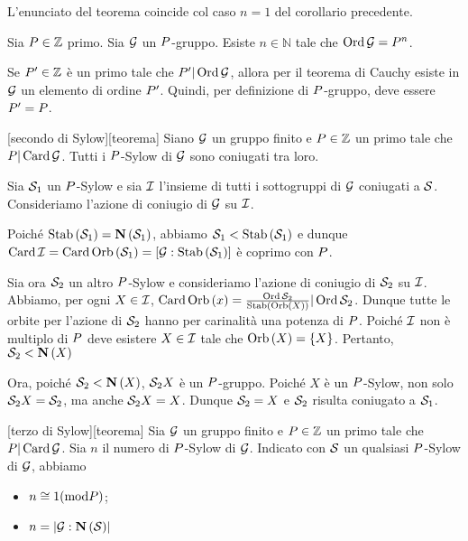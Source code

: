 \Proof
L'enunciato del teorema coincide col caso $n = 1$ del corollario precedente.
\EndProof
\begin{Corollary}
	Sia $P \in \mathbb{Z}$ primo.
	Sia $\mathcal{G}$ un $P$-gruppo.
	Esiste $n \in \mathbb{N}$ tale che
	$\operatorname{\operatorname{Ord}}{\mathcal{G}} = P^n$.
\end{Corollary}
\Proof
Se $P' \in \mathbb{Z}$ \`e un primo tale che
$P' | \operatorname{\operatorname{Ord}}{\mathcal{G}}$,
allora per il teorema di Cauchy esiste in $\mathcal{G}$ un elemento di
ordine $P'$.
Quindi, per definizione di $P$-gruppo,
deve essere $P' = P$.
\EndProof
\begin{Theorem}
[secondo di Sylow][teorema]
	Siano $\mathcal{G}$ un gruppo finito e 
	$P \in \mathbb{Z}$ un primo tale che
	$P | \operatorname{Card}{\mathcal{G}}$.
	Tutti i $P$-Sylow di $\mathcal{G}$ sono coniugati tra loro.
\end{Theorem}
\Proof
Sia $\Sylow_1$ un $P$-Sylow e
sia $\mathcal{I}$ l'insieme di tutti i sottogruppi di $\mathcal{G}$
coniugati a $\Sylow$.
Consideriamo l'azione di coniugio di $\mathcal{G}$ su $\mathcal{I}$.
\par
Poich\'e $\Stabilizer{\Sylow_1} = \Normalizer{\Sylow_1}$,
abbiamo $\Sylow_1 \IsSubgroup \Stabilizer{\Sylow_1}$ e dunque
$\Cardinality{\Set} =
\Cardinality{\Orbit{\Sylow_1}} =
\GroupIndex{\Group}{\Stabilizer{\Sylow_1}}$
\`e coprimo con $P$.
\par
Sia ora $\Sylow_2$ un altro $P$-Sylow e
consideriamo l'azione di coniugio di $\Sylow_2$ su $\mathcal{I}$.
Abbiamo, per ogni $X \in \mathcal{I}$,
$\Cardinality{\Orbit{x}} =
\frac{\GroupOrder{\Sylow_2}}{\Stabilizer{\Orbit{X}}} |
\GroupOrder{\Sylow_2}$.
Dunque tutte le orbite per l'azione di $\Sylow_2$ hanno per carinalit\`a
una potenza di $P$. Poich\'e $\mathcal{I}$ non \`e multiplo di $P$ deve
esistere $X \in \mathcal{I}$ tale che $\Orbit{X} = \lbrace X \rbrace$.
Pertanto, $\Sylow_2 \IsSubgroup \Normalizer{X}$
\par
Ora, poich\'e $\Sylow_2 \IsSubgroup \Normalizer{X}$, $\Sylow_2 X$ \`e un
$P$-gruppo. Poich\'e $X$ \`e un $P$-Sylow, non solo
$\Sylow_2 X = \Sylow_2$, ma anche $\Sylow_2 X = X$. Dunque $\Sylow_2 = X$
e $\Sylow_2$ risulta coniugato a $\Sylow_1$.
\EndProof
\begin{Theorem}
[terzo di Sylow][teorema]
	Sia $\mathcal{G}$ un gruppo finito e
	$P \in \mathbb{Z}$ un primo tale che
	$P | \operatorname{Card}{\mathcal{G}}$.
	Sia $n$ il numero di $P$-Sylow di $\mathcal{G}$.
	Indicato con $\Sylow$ un qualsiasi $P$-Sylow di $\mathcal{G}$,
	abbiamo
	\begin{itemize}
		\item $n \cong 1 (\text{mod} P)$;
		\item $n = \Index{\Group}{\Normalizer{\Sylow}}$
	\end{itemize}
\end{Theorem}
